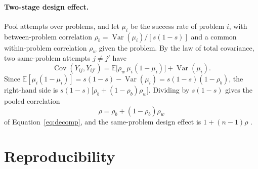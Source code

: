 \documentclass[11pt]{article}
\newcommand{\E}{\mathbb{E}}
\newcommand{\Var}{\operatorname{Var}}
\newcommand{\Cov}{\operatorname{Cov}}
\begin{document}
\paragraph{Two-stage design effect.}
Pool attempts over problems, and let $\mu_i$ be the success rate of problem $i$, with between-problem correlation $\rho_b = \Var(\mu_i)/[s(1-s)]$ and a common within-problem correlation $\rho_w$ given the problem. By the law of total covariance, two same-problem attempts $j\ne j'$ have
\[
\Cov(Y_{ij},Y_{ij'}) = \E\!\big[\rho_w\,\mu_i(1-\mu_i)\big] + \Var(\mu_i).
\]
Since $\E[\mu_i(1-\mu_i)] = s(1-s) - \Var(\mu_i) = s(1-s)(1-\rho_b)$, the right-hand side is $s(1-s)\big[\rho_b + (1-\rho_b)\rho_w\big]$. Dividing by $s(1-s)$ gives the pooled correlation
\[
\rho = \rho_b + (1-\rho_b)\rho_w
\]
of Equation~\eqref{eq:decomp}, and the same-problem design effect is $1+(n-1)\rho$ \citep{cochran1977sampling}.

\section{Reproducibility}
\label{app:repro}
\end{document}

